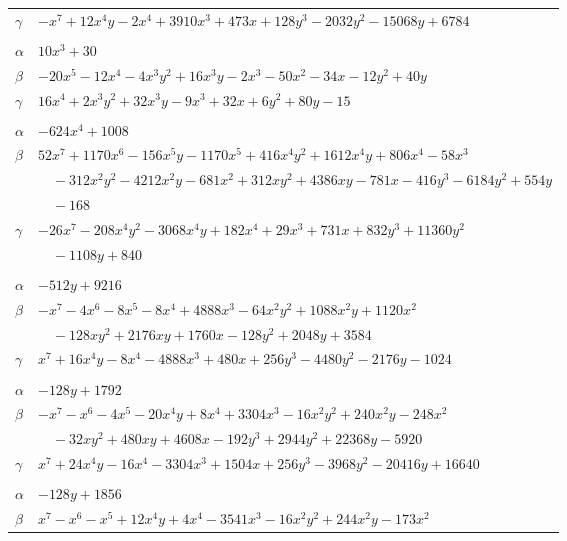 \documentclass[11pt]{article}
\begin{document}
\begin{longtable}{@{}ll@{}}
$\gamma$ & $-x^{7}+12x^{4}y-2x^{4}+3910x^{3}+473x+128y^{3}-2032y^{2}-15068y+6784$\\
\addlinespace[3pt]
\multicolumn{2}{@{}l}{$\{i,j\}=\{17,24\}$, $k_{ij}=2^{2}\cdot 3\cdot 5$}\\
$\alpha$ & $10x^{3}+30$\\
$\beta$ & $-20x^{5}-12x^{4}-4x^{3}y^{2}+16x^{3}y-2x^{3}-50x^{2}-34x-12y^{2}+40y$\\
$\gamma$ & $16x^{4}+2x^{3}y^{2}+32x^{3}y-9x^{3}+32x+6y^{2}+80y-15$\\
\addlinespace[3pt]
\multicolumn{2}{@{}l}{$\{i,j\}=\{17,30\}$, $k_{ij}=2^{5}\cdot 3^{2}\cdot 7$}\\
$\alpha$ & $-624x^{4}+1008$\\
$\beta$ & $52x^{7}+1170x^{6}-156x^{5}y-1170x^{5}+416x^{4}y^{2}+1612x^{4}y+806x^{4}-58x^{3}$\\
 & $\quad -312x^{2}y^{2}-4212x^{2}y-681x^{2}+312xy^{2}+4386xy-781x-416y^{3}-6184y^{2}+554y$\\
 & $\quad -168$\\
$\gamma$ & $-26x^{7}-208x^{4}y^{2}-3068x^{4}y+182x^{4}+29x^{3}+731x+832y^{3}+11360y^{2}$\\
 & $\quad -1108y+840$\\
\addlinespace[3pt]
\multicolumn{2}{@{}l}{$\{i,j\}=\{18,19\}$, $k_{ij}=2^{11}\cdot 3^{2}$}\\
$\alpha$ & $-512y+9216$\\
$\beta$ & $-x^{7}-4x^{6}-8x^{5}-8x^{4}+4888x^{3}-64x^{2}y^{2}+1088x^{2}y+1120x^{2}$\\
 & $\quad -128xy^{2}+2176xy+1760x-128y^{2}+2048y+3584$\\
$\gamma$ & $x^{7}+16x^{4}y-8x^{4}-4888x^{3}+480x+256y^{3}-4480y^{2}-2176y-1024$\\
\addlinespace[3pt]
\multicolumn{2}{@{}l}{$\{i,j\}=\{18,20\}$, $k_{ij}=2^{12}\cdot 3^{2}$}\\
$\alpha$ & $-128y+1792$\\
$\beta$ & $-x^{7}-x^{6}-4x^{5}-20x^{4}y+8x^{4}+3304x^{3}-16x^{2}y^{2}+240x^{2}y-248x^{2}$\\
 & $\quad -32xy^{2}+480xy+4608x-192y^{3}+2944y^{2}+22368y-5920$\\
$\gamma$ & $x^{7}+24x^{4}y-16x^{4}-3304x^{3}+1504x+256y^{3}-3968y^{2}-20416y+16640$\\
\addlinespace[3pt]
\multicolumn{2}{@{}l}{$\{i,j\}=\{20,22\}$, $k_{ij}=2^{5}\cdot 3^{3}\cdot 5$}\\
$\alpha$ & $-128y+1856$\\
$\beta$ & $x^{7}-x^{6}-x^{5}+12x^{4}y+4x^{4}-3541x^{3}-16x^{2}y^{2}+244x^{2}y-173x^{2}$\\

\end{longtable}
\end{document}
